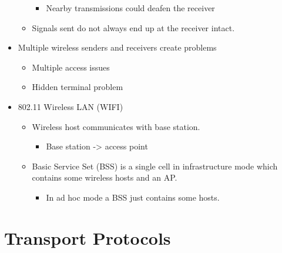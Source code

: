 \begin{itemize}
\begin{itemize}
    \begin{itemize}
    \tightlist
    \item
      Nearby transmissions could deafen the receiver
    \end{itemize}
  \item
    Signals sent do not always end up at the receiver intact.
  \end{itemize}
\item
  Multiple wireless senders and receivers create problems

  \begin{itemize}
  \tightlist
  \item
    Multiple access issues
  \item
    Hidden terminal problem
  \end{itemize}
\item
  802.11 Wireless LAN (WIFI)

  \begin{itemize}
  \tightlist
  \item
    Wireless host communicates with base station.

    \begin{itemize}
    \tightlist
    \item
      Base station -\textgreater{} access point
    \end{itemize}
  \item
    Basic Service Set (BSS) is a single cell in infrastructure mode
    which contains some wireless hosts and an AP.

    \begin{itemize}
    \tightlist
    \item
      In ad hoc mode a BSS just contains some hosts.
    \end{itemize}
  \end{itemize}
\end{itemize}

\hypertarget{transport-protocols}{%
\section{Transport Protocols}\label{transport-protocols}}

